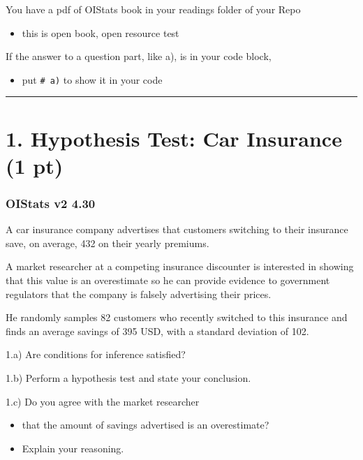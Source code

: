 \documentclass[
]{article}
\providecommand{\tightlist}{%
  \setlength{\itemsep}{0pt}\setlength{\parskip}{0pt}}
\begin{document}
You have a pdf of OIStats book in your readings folder of your Repo

\begin{itemize}
\tightlist
\item
  this is open book, open resource test
\end{itemize}

If the answer to a question part, like a), is in your code block,

\begin{itemize}
\tightlist
\item
  put \texttt{\#\ a)} to show it in your code
\end{itemize}

\begin{center}\rule{0.5\linewidth}{0.5pt}\end{center}

\hypertarget{hypothesis-test-car-insurance-1-pt}{%
\section{1. Hypothesis Test: Car Insurance (1
pt)}\label{hypothesis-test-car-insurance-1-pt}}

\hypertarget{oistats-v2-4.30}{%
\subsubsection{OIStats v2 4.30}\label{oistats-v2-4.30}}

A car insurance company advertises that customers switching to their
insurance save, on average, 432 on their yearly premiums.

A market researcher at a competing insurance discounter is interested in
showing that this value is an overestimate so he can provide evidence to
government regulators that the company is falsely advertising their
prices.

He randomly samples 82 customers who recently switched to this insurance
and finds an average savings of 395 USD, with a standard deviation of
102.

1.a) Are conditions for inference satisfied?

1.b) Perform a hypothesis test and state your conclusion.

1.c) Do you agree with the market researcher

\begin{itemize}
\tightlist
\item
  that the amount of savings advertised is an overestimate?
\item
  Explain your reasoning.
\end{itemize}
\end{document}
